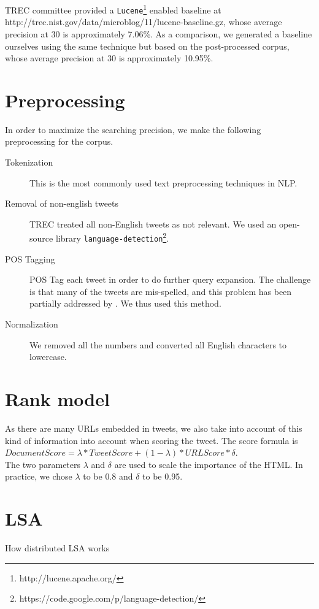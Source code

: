 \documentclass{acm_proc_article-sp}
\begin{document}
TREC committee provided a \texttt{Lucene}\footnote{http://lucene.apache.org/} enabled baseline at http://trec.nist.gov/data/microblog/11/lucene-baseline.gz, whose average precision at 30 is approximately 7.06\%. As a comparison, we generated a baseline ourselves using the same technique but based on the post-processed corpus, whose average precision at 30 is approximately 10.95\%.
   
\section{Preprocessing}
In order to maximize the searching precision, we make the following preprocessing for the corpus.
\begin{description}
\item[Tokenization] This is the most commonly used text preprocessing techniques in NLP.
\item[Removal of non-english tweets] TREC treated all non-English tweets as not relevant. We used an open-source library \texttt{language-detection}\footnote{https://code.google.com/p/language-detection/}.
\item[POS Tagging] POS Tag each tweet in order to do further query expansion. The challenge is that many of the tweets are mis-spelled, and this problem has been partially addressed by \cite{owoputi2013improved}. We thus used this method.
\item[Normalization] We removed all the numbers and converted all English characters to lowercase.
\end{description}

\section{Rank model}
As there are many URLs embedded in tweets, we also take into account of this kind of information into account when scoring the tweet. The score formula is\\ $DocumentScore = \lambda*TweetScore + (1-\lambda)*URLScore*\delta$.\\ The two parameters $\lambda$ and $\delta$ are used to scale the importance of the HTML. In practice, we chose $\lambda$ to be 0.8 and $\delta$ to be 0.95.


\section{LSA}
How distributed LSA works\\
\end{document}
